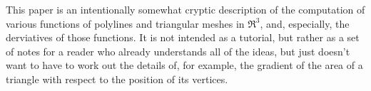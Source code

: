 \label{sec:Introduction}

This paper is an intentionally somewhat cryptic description
of the computation of various functions of polylines
and triangular meshes in $\Re^3$,
and, especially, the derviatives of those functions.
It is not intended as a tutorial,
but rather as a set of notes for a reader who
already understands all of the ideas,
but just doesn't want to have to work out the
details of, for example, the gradient of the
area of a triangle with respect 
to the position of its vertices.

